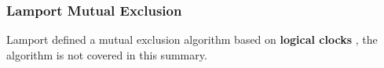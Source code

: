 \documentclass[12pt,A4]{extarticle}
\begin{document}
\subsubsection{Lamport Mutual Exclusion}
Lamport defined a mutual exclusion algorithm based on \textbf{logical clocks} \cite{lamportTimeClocks}, the algorithm is not covered in this summary.


\newpage


\end{document}
